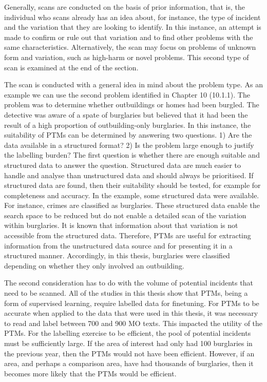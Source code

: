 Generally, scans are conducted on the basis of prior information, that is, the individual who scans already has an idea about, for instance, the type of incident and the variation that they are looking to identify. In this instance, an attempt is made to confirm or rule out that variation and to find other problems with the same characteristics. Alternatively, the scan may focus on problems of unknown form and variation, such as high-harm or novel problems. This second type of scan is examined at the end of the section. 

The scan is conducted with a general idea in mind about the problem type. As an example we can use the second problem identified in Chapter 10 (10.1.1). The problem was to determine whether outbuildings or homes had been burgled. The detective was aware of a spate of burglaries but believed that it had been the result of a high proportion of outbuilding-only burglaries. In this instance, the suitability of PTMs can be determined by answering two questions. 1) Are the data available in a structured format? 2) Is the problem large enough to justify the labelling burden? The first question is whether there are enough suitable and structured data to answer the question. Structured data are much easier to handle and analyse than unstructured data and should always be prioritised. If structured data are found, then their suitability should be tested, for example for completeness and accuracy. In the example, some structured data were available. For instance, crimes are classified as burglaries. These structured data enable the search space to be reduced but do not enable a detailed scan of the variation within burglaries. It is known that information about that variation is not accessible from the structured data. Therefore, PTMs are useful for extracting information from the unstructured data source and for presenting it in a structured manner. Accordingly, in this thesis, burglaries were classified depending on whether they only involved an outbuilding.

The second consideration has to do with the volume of potential incidents that need to be scanned. All of the studies in this thesis show that PTMs, being a form of supervised learning, require labelled data for finetuning. For PTMs to be accurate when applied to the data that were used in this thesis, it was necessary to read and label between 700 and 900 MO texts. This impacted the utility of the PTMs. For the labelling exercise to be efficient, the pool of potential incidents must be sufficiently large. If the area of interest had only had 100 burglaries in the previous year, then the PTMs would not have been efficient. However, if an area, and perhaps a comparison area, have had thousands of burglaries, then it becomes more likely that the PTMs would be efficient.

